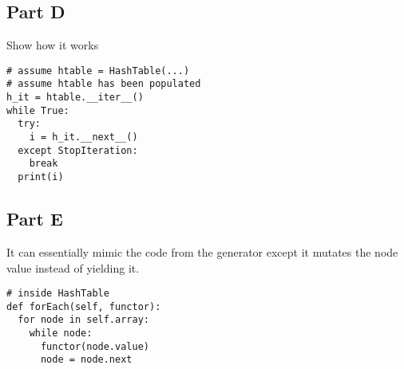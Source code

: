 \subsection*{Part D}
Show how it works
\begin{verbatim}
# assume htable = HashTable(...)
# assume htable has been populated
h_it = htable.__iter__()
while True:
  try:
    i = h_it.__next__()
  except StopIteration:
    break
  print(i)
\end{verbatim}

\subsection*{Part E}
It can essentially mimic the code from the generator except it mutates
the node value instead of yielding it.
\begin{verbatim}
# inside HashTable
def forEach(self, functor):
  for node in self.array:
    while node:
      functor(node.value)
      node = node.next
\end{verbatim}